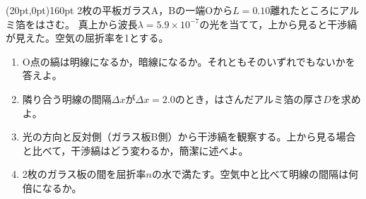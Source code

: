 \hakosyokika
\item
    \begin{mawarikomi}(20pt,0pt){160pt}{}
    2枚の平板ガラスA，Bの一端Oから$L=0.10$離れたところにアルミ箔をはさむ。
    真上から波長$\lambda = 5.9\times 10^{-7}$の光を当てて，上から見ると干渉縞が見えた。空気の屈折率を1とする。
        \begin{enumerate}
            \item O点の縞は明線になるか，暗線になるか。それともそのいずれでもないかを答えよ。
            \item 隣り合う明線の間隔$\varDelta x$が$\varDelta x=2.0$のとき，はさんだアルミ箔の厚さ$D$を求めよ。
            \item 光の方向と反対側（ガラス板B側）から干渉縞を観察する。上から見る場合と比べて，干渉縞はどう変わるか，簡潔に述べよ。
            \item 2枚のガラス板の間を屈折率$n$の水で満たす。空気中と比べて明線の間隔は何倍になるか。
        \end{enumerate}
    \end{mawarikomi}